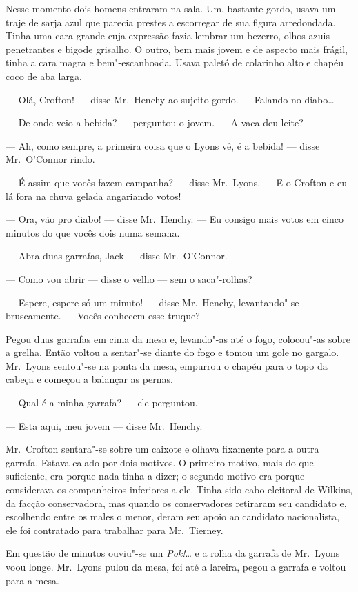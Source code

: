 Nesse momento dois homens entraram na sala.  Um, bastante gordo, usava um traje
de sarja azul que parecia prestes a escorregar de sua figura arredondada.
Tinha uma cara grande cuja expressão fazia lembrar um bezerro, olhos azuis
penetrantes e bigode grisalho.  O outro, bem mais jovem e de aspecto mais
frágil, tinha a cara magra e bem"-escanhoada.  Usava paletó de colarinho alto e
chapéu coco de aba larga.

--- Olá, Crofton! --- disse Mr.~Henchy ao sujeito gordo.  --- Falando no
diabo\ldots{}

--- De onde veio a bebida? --- perguntou o jovem.  --- A vaca deu leite?

--- Ah, como sempre, a primeira coisa que o Lyons vê, é a bebida! --- disse Mr.~O’Connor rindo.

--- É assim que vocês fazem campanha? --- disse Mr.~Lyons.  --- E o Crofton e
eu lá fora na chuva gelada angariando votos!

--- Ora, vão pro diabo! --- disse Mr.~Henchy.  --- Eu consigo mais votos em
cinco minutos do que vocês dois numa semana.

--- Abra duas garrafas, Jack --- disse Mr.~O’Connor.

--- Como vou abrir --- disse o velho --- sem o saca"-rolhas?

--- Espere, espere só um minuto! --- disse Mr.~Henchy, levantando"-se
bruscamente. --- Vocês conhecem esse truque?

Pegou duas garrafas em cima da mesa e, levando"-as até o fogo, colocou"-as sobre
a grelha.  Então voltou a sentar"-se diante do fogo e tomou um gole no gargalo.
Mr.~Lyons sentou"-se na ponta da mesa, empurrou o chapéu para o topo da cabeça e
começou a balançar as pernas.

--- Qual é a minha garrafa? --- ele perguntou.

--- Esta aqui, meu jovem --- disse Mr.~Henchy.

Mr.~Crofton sentara"-se sobre um caixote e olhava fixamente para a outra
garrafa.  Estava calado por dois motivos.  O primeiro motivo, mais do que
suficiente, era porque nada tinha a dizer; o segundo motivo era porque
considerava os companheiros inferiores a ele.  Tinha sido cabo eleitoral de
Wilkins, da facção conservadora, mas quando os conservadores retiraram seu
candidato e, escolhendo entre os males o menor, deram seu apoio ao candidato
nacionalista, ele foi contratado para trabalhar para Mr.~Tierney.

Em questão de minutos ouviu"-se um \textit{Pok!}\ldots{} e a rolha da garrafa de
Mr.~Lyons voou longe.  Mr.~Lyons pulou da mesa, foi até a lareira, pegou a
garrafa e voltou para a mesa.


